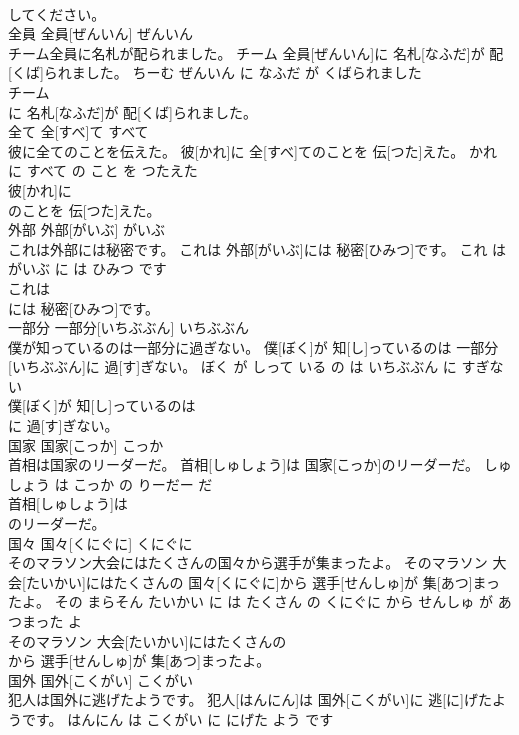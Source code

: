 \documentclass[8pt]{extreport}
\begin{document}
\begin{CJK}{UTF8}{min}
\\	してください。			
\\	全員	全員[ぜんいん]	ぜんいん	
\\	チーム全員に名札が配られました。	チーム 全員[ぜんいん]に 名札[なふだ]が 配[くば]られました。	ちーむ ぜんいん に なふだ が くばられました	
\\	チーム
\\	に 名札[なふだ]が 配[くば]られました。			
\\	全て	全[すべ]て	すべて	
\\	彼に全てのことを伝えた。	彼[かれ]に 全[すべ]てのことを 伝[つた]えた。	かれ に すべて の こと を つたえた	
\\	彼[かれ]に
\\	のことを 伝[つた]えた。			
\\	外部	外部[がいぶ]	がいぶ	
\\	これは外部には秘密です。	これは 外部[がいぶ]には 秘密[ひみつ]です。	これ は がいぶ に は ひみつ です	
\\	これは
\\	には 秘密[ひみつ]です。			
\\	一部分	一部分[いちぶぶん]	いちぶぶん	
\\	僕が知っているのは一部分に過ぎない。	僕[ぼく]が 知[し]っているのは 一部分[いちぶぶん]に 過[す]ぎない。	ぼく が しって いる の は いちぶぶん に すぎない	
\\	僕[ぼく]が 知[し]っているのは
\\	に 過[す]ぎない。			
\\	国家	国家[こっか]	こっか	
\\	首相は国家のリーダーだ。	首相[しゅしょう]は 国家[こっか]のリーダーだ。	しゅしょう は こっか の りーだー だ	
\\	首相[しゅしょう]は
\\	のリーダーだ。			
\\	国々	国々[くにぐに]	くにぐに	
\\	そのマラソン大会にはたくさんの国々から選手が集まったよ。	そのマラソン 大会[たいかい]にはたくさんの 国々[くにぐに]から 選手[せんしゅ]が 集[あつ]まったよ。	その まらそん たいかい に は たくさん の くにぐに から せんしゅ が あつまった よ	
\\	そのマラソン 大会[たいかい]にはたくさんの
\\	から 選手[せんしゅ]が 集[あつ]まったよ。			
\\	国外	国外[こくがい]	こくがい	
\\	犯人は国外に逃げたようです。	犯人[はんにん]は 国外[こくがい]に 逃[に]げたようです。	はんにん は こくがい に にげた よう です	

\end{CJK}
\end{document}
